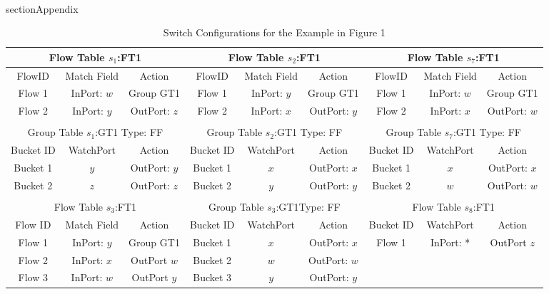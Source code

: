 \\section{Appendix}
\begin{table*}[t]
  \label{ex2_s1_ft}
  \centering
  \vspace{0.3cm}
  \caption{Switch Configurations for the Example in Figure 1}
  \begin{tabular}{||ccc||ccc||ccc||}
    \hline
    \multicolumn{3}{||c||}{ Flow Table $s_1$:FT1}&\multicolumn{3}{c||}{ Flow Table $s_2$:FT1}&\multicolumn{3}{|c||}{ Flow Table $s_7$:FT1} \\
    \hline  \hline
    FlowID & Match Field & Action &     FlowID & Match Field & Action &    FlowID & Match Field & Action \\ [0.5ex]
    \hline
    Flow 1 & InPort: $w$ & Group GT1   &Flow 1 & InPort: $y$ & Group GT1     &Flow 1 &InPort: $w$ & Group GT1   \\
    Flow 2 & InPort: $y$ & OutPort: $z$ &Flow 2 & InPort: $x$ & OutPort: $y$   &Flow 2 &InPort: $x$ & OutPort: $w$ \\[1ex]
    \hline
    \multicolumn{9}{c}{ } \\[-1.75ex]
    \hline%



    \multicolumn{3}{||c||}{ Group Table $s_1$:GT1 Type: FF}&\multicolumn{3}{c||}{ Group Table $s_2$:GT1 Type: FF}&\multicolumn{3}{|c||}{ Group Table $s_7$:GT1 Type: FF} \\
    \hline  \hline
    Bucket ID & WatchPort & Action & Bucket ID & WatchPort & Action & Bucket ID & WatchPort & Action \\ [0.5ex]
    \hline
    Bucket 1 &  $y$ & OutPort: $y$   & Bucket 1 &  $x$ & OutPort: $x$ &Bucket 1 & $x$ & OutPort: $x$ \\
    Bucket 2 &  $z$ & OutPort: $z$ & Bucket 2   &  $y$ & OutPort: $y$ &Bucket 2 & $w$ & OutPort: $w$ \\[1ex]
    \hline
    \multicolumn{9}{c}{ } \\[-1.75ex]
    \hline





    \multicolumn{3}{||c||}{ Flow Table $s_3$:FT1}&\multicolumn{3}{c||}{ Group Table $s_3$:GT1Type: FF}&\multicolumn{3}{|c||}{ Flow Table $s_8$:FT1} \\
    \hline \hline
    \vspace{.1mm}
    Flow ID & Match Field  & Action &     Bucket ID & WatchPort & Action &    Bucket ID & WatchPort & Action \\ [0.5ex]
    \hline
    Flow 1 & InPort: $y$ & Group GT1   &Bucket 1 &  $x$ & OutPort: $x$  &Flow 1 &InPort: * & OutPort $z$  \\
    Flow 2 & InPort: $x$ & OutPort $w$ &Bucket 2 &  $w$ & OutPort: $w$  &&& \\
    Flow 3 & InPort: $w$ & OutPort $y$ &Bucket 3 &  $y$ & OutPort: $y$  &&& \\[1ex]
    \hline

  \end{tabular}
\end{table*}

